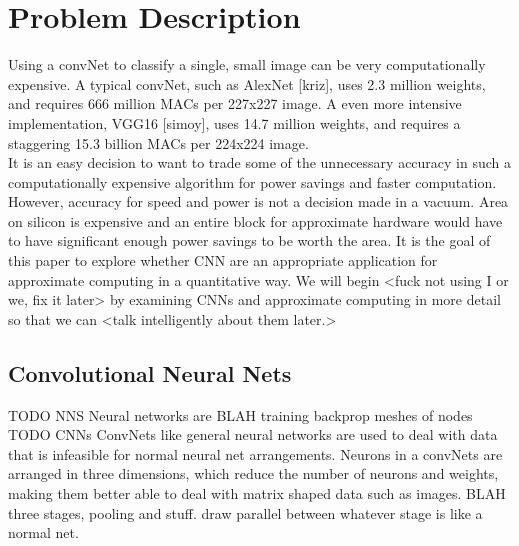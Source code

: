 \documentclass[conference]{IEEEtran}
\begin{document}
	
\section{Problem Description}
	\indent Using a convNet to classify a single, small image can be very computationally expensive. A typical convNet, such as AlexNet [kriz], uses 2.3 million weights, and requires 666 million MACs per 227x227 image. A even more intensive implementation, VGG16 [simoy], uses 14.7 million weights, and requires a staggering 15.3 billion MACs per 224x224 image.\\
	\indent It is an easy decision to want to trade some of the unnecessary accuracy in such a computationally expensive algorithm for power savings and faster computation. However, accuracy for speed and power is not a decision made in a vacuum. Area on silicon is expensive and an entire block for approximate hardware would have to have significant enough power savings to be worth the area. It is the goal of this paper to explore whether CNN are an appropriate application for approximate computing in a quantitative way. We will begin <fuck not using I or we, fix it later> by examining CNNs and approximate computing in more detail so that we can <talk intelligently about them later.>\\

\subsection{Convolutional Neural Nets}
TODO NNS
	\indent Neural networks are BLAH training backprop meshes of nodes\\
	
TODO CNNs
	\indent ConvNets like general neural networks are used to deal with data that is infeasible for normal neural net arrangements. Neurons in a convNets are arranged in three dimensions, which reduce the number of neurons and weights, making them better able to deal with matrix shaped data such as images. BLAH three stages, pooling and stuff. draw parallel between whatever stage is like a normal net.  \\
	
\end{document}
